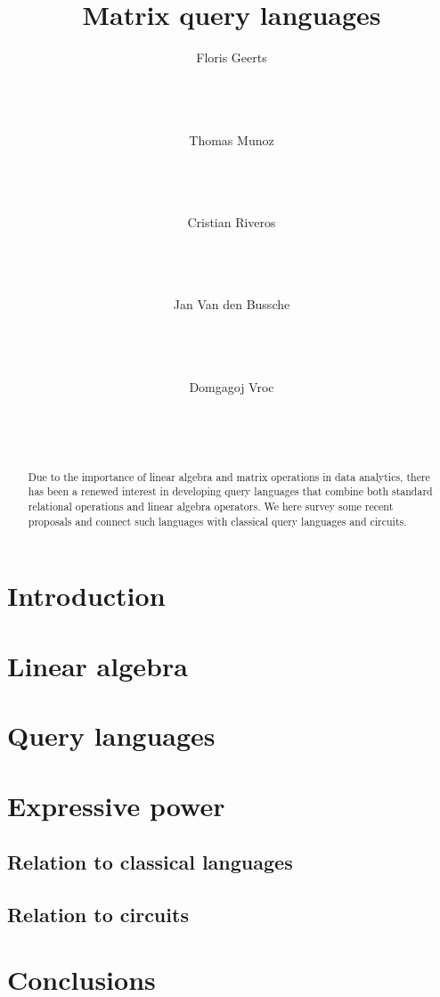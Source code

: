 \documentclass{sig-alternate}
\title{Matrix query languages}
\author{
\alignauthor Floris Geerts\\
 \affaddr{Institute for Clarity in Documentation}\\
 \affaddr{1932 Wallamaloo Lane}\\
 \affaddr{Wallamaloo, New Zealand}\\
 \email{trovato@corporation.com}\and
\alignauthor Thomas Munoz
\\ \affaddr{The Th{\o}rv\"{a}ld Group}\\
 \affaddr{1 Th{\o}rv\"{a}ld Circle}\\
 \affaddr{Hekla, Iceland}\\
 \email{larst@affiliation.org}\and
 \alignauthor Cristian Riveros
 \\ \affaddr{The Th{\o}rv\"{a}ld Group}\\
  \affaddr{1 Th{\o}rv\"{a}ld Circle}\\
  \affaddr{Hekla, Iceland}\\
  \email{larst@affiliation.org}\and
   \alignauthor Jan Van den Bussche
 \\ \affaddr{The Th{\o}rv\"{a}ld Group}\\
  \affaddr{1 Th{\o}rv\"{a}ld Circle}\\
  \affaddr{Hekla, Iceland}\\
  \email{larst@affiliation.org}\and
 \alignauthor Domgagoj Vroc
 \\ \affaddr{The Th{\o}rv\"{a}ld Group}\\
  \affaddr{1 Th{\o}rv\"{a}ld Circle}\\
  \affaddr{Hekla, Iceland}\\
  \email{larst@affiliation.org}

}
\begin{document}
\maketitle
\begin{abstract}
Due to the importance of linear algebra and matrix operations in 
data analytics, there has been a renewed interest in developing query
languages that combine both standard relational operations and linear
algebra operators. We here survey some recent proposals and connect
such languages with classical query languages and circuits. 	
\end{abstract}

\section{Introduction}

\section{Linear algebra}


\section{Query languages}



\section{Expressive power}

\subsection{Relation to classical languages}



\subsection{Relation to circuits}

\section{Conclusions}
\end{document}
